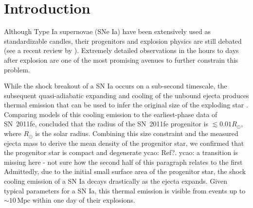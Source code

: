 \documentclass[twocolumn]{aastex61}
\newcommand{\sr}{R_\odot}
\newcommand{\ycao}[1]{{\color{red} ycao: {#1}}}
\begin{document}


\section{Introduction}
\label{sec:intro}

Although Type Ia supernovae (SNe Ia) have been extensively used as
standardizable candles, their progenitors and explosion
physics are still debated (see a recent review by
\citealt{2014ARA&A..52..107M}). Extremely detailed
observations in the hours to days after explosion are one of the most promising avenues to further
constrain this problem.

While the shock breakout of a SN Ia occurs on a sub-second timescale,
the subsequent quasi-adiabatic expanding and cooling of the unbound
ejecta produces thermal emission that can be used to infer the
original size of the exploding star
\citep{2010ApJ...708..598P,2011ApJ...728...63R}. Comparing models of
this cooling emission to the earliest-phase data of SN~2011fe,
\citet{2012ApJ...744L..17B} concluded that the radius of the SN~2011fe progenitor is $\lesssim0.01\sr$, where $\sr$ is the solar
radius. Combining this size constraint and the measured ejecta mass to
derive the mean density of the progenitor star, we confirmed that the
progenitor star is compact and degenerate\ycao{Ref?}. \ycao{a transition is missing here - not sure how the second half of this paragraph relates to the first} Admittedly, due to the
initial small surface area of the progenitor star, the shock cooling
emission of a SN Ia decays drastically as the ejecta expands. Given
typical parameters for a SN Ia, this thermal emission is visible from
events up to $\sim 10\,\textrm{Mpc}$ within one day of their explosions.
\end{document}
